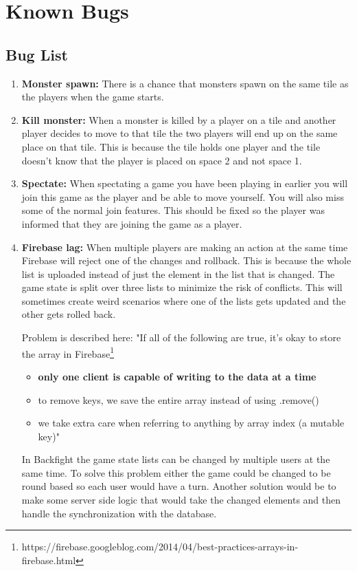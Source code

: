 \pagestyle{Uni}

\chapter{Known Bugs}
\label{ch:knownBugs}

\section{Bug List}

\begin{enumerate}
	\item \textbf{Monster spawn:} There is a chance that monsters spawn on the same tile as the players when the game starts.
	
	\item \textbf{Kill monster:} When a monster is killed by a player on a tile and another player decides to move to that tile the two players will end up on the same place on that tile. This is because the tile holds one player and the tile doesn't know that the player is placed on space 2 and not space 1.
		
	\item \textbf{Spectate:} When spectating a game you have been playing in earlier you will join this game as the player and be able to move yourself. You will also miss some of the normal join features. This should be fixed so the player was informed that they are joining the game as a player.

	\item \textbf{Firebase lag:} When multiple players are making an action at the same time Firebase will reject one of the changes and rollback. This is because the whole list is uploaded instead of just the element in the list that is changed. The game state is split over three lists to minimize the risk of conflicts. This will sometimes create weird scenarios where one of the lists gets updated and the other gets rolled back.
	
	Problem is described here: "If all of the following are true, it's okay to store the array in Firebase\footnote{https://firebase.googleblog.com/2014/04/best-practices-arrays-in-firebase.html}
	
	\begin{itemize}
		\item \textbf{only one client is capable of writing to the data at a time}
		\item to remove keys, we save the entire array instead of using .remove()
		\item we take extra care when referring to anything by array index (a mutable key)"
	\end{itemize}
	In Backfight the game state lists can be changed by multiple users at the same time. To solve this problem either the game could be changed to be round based so each user would have a turn. Another solution would be to make some server side logic that would take the changed elements and then handle the synchronization with the database.
	

\end{enumerate}
